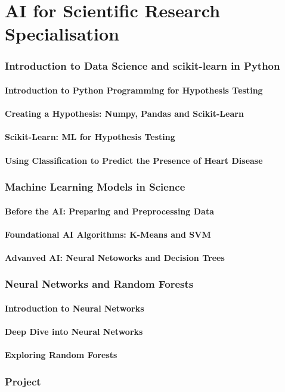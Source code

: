 \documentclass[a4paper, 11pt]{book}
\begin{document}
    \part{AI for Scientific Research Specialisation}

    \section{Introduction to Data Science and scikit-learn in Python}
    \subsection{Introduction to Python Programming for Hypothesis Testing}
    \subsection{Creating a Hypothesis: Numpy, Pandas and Scikit-Learn}
    \subsection{Scikit-Learn: ML for Hypothesis Testing}
    \subsection{Using Classification to Predict the Presence of Heart Disease}
    
    \section{Machine Learning Models in Science}
    \subsection{Before the AI: Preparing and Preprocessing Data}
    \subsection{Foundational AI Algorithms: K-Means and SVM}
    \subsection{Advanved AI: Neural Netoworks and Decision Trees}
    
    \section{Neural Networks and Random Forests}
    \subsection{Introduction to Neural Networks}
    \subsection{Deep Dive into Neural Networks}
    \subsection{Exploring Random Forests}

    \section{Project}
\end{document}
